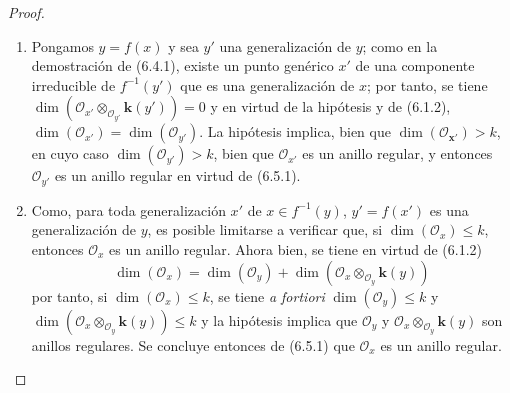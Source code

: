 \begin{proof}
\medskip\noindent
\begin{enumerate}
\item[(i)] Pongamos $y=f(x)$ y sea $y'$ una generalización de $y$; como
en la demostración de (6.4.1), existe un punto genérico $x'$ de una
componente irreducible de $f^{-1}(y')$ que es una generalización de $x$;
por tanto, se tiene
$\dim(\mathcal O_{x'}\otimes_{\mathcal O_{y'}}\boldsymbol{k}(y'))=0$
y en virtud de la hipótesis y de (6.1.2),
$\dim(\mathcal O_{x'})=\dim(\mathcal O_{y'})$.
La hipótesis implica, bien que
$\dim(\mathcal O_{\boldsymbol{x}'})>k$, en cuyo caso
$\dim(\mathcal O_{y'})>k$, bien que $\mathcal O_{x'}$ es un anillo
regular, y entonces $\mathcal O_{y'}$ es un anillo regular en virtud de
(6.5.1).

\item[(ii)] Como, para toda generalización $x'$ de $x\in f^{-1}(y)$,
$y'=f(x')$ es una generalización de $y$, es posible limitarse a verificar que,
si $\dim(\mathcal O_x)\leqslant k$, entonces $\mathcal O_x$ es un anillo
regular. Ahora bien, se tiene en virtud de (6.1.2)
\[
\dim(\mathcal O_x)=\dim(\mathcal O_y)
+\dim(\mathcal O_x\otimes_{\mathcal O_y}\boldsymbol{k}(y))
\]
por tanto, si $\dim(\mathcal O_x)\leqslant k$, se tiene \emph{a fortiori}
$\dim(\mathcal O_y)\leqslant k$ y
$\dim(\mathcal O_x\otimes_{\mathcal O_y}\boldsymbol{k}(y))\leqslant k$ y la hipótesis
implica que $\mathcal O_y$ y
$\mathcal O_x\otimes_{\mathcal O_y}\boldsymbol{k}(y)$ son anillos regulares. Se concluye
entonces de (6.5.1) que $\mathcal O_x$ es un anillo regular.
\end{enumerate}
\end{proof}
